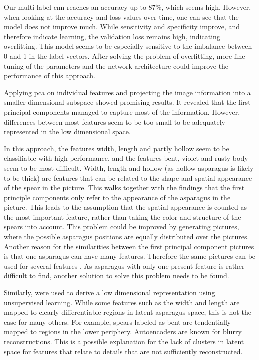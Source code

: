 Our multi-label  \acrshort{cnn} reaches an accuracy up to 87\%, which seems high. However, when looking at the accuracy and loss values over time, one can see that the model does not improve much. While sensitivity and specificity improve, and therefore indicate learning, the validation loss remains high, indicating overfitting. This model seems to be especially sensitive to the imbalance between 0 and 1 in the label vectors. After solving the problem of overfitting, more fine-tuning of the parameters and the network architecture could improve the performance of this approach.

\bigskip
Applying \acrshort{pca} on individual features and projecting the image information into a smaller dimensional subspace showed promising results. It revealed that the first principal components managed to capture most of the information. However, differences between most features seem to be too small to be adequately represented in the low dimensional space.

In this approach, the features width, length and partly hollow seem to be classifiable with high performance, and the features bent, violet and rusty body seem to be most difficult. Width, length and hollow (as hollow asparagus is likely to be thick) are features that can be related to the shape and spatial appearance of the spear in the picture. This walks together with the findings that the first principle components only refer to the appearance of the asparagus in the picture. This leads to the assumption that the spatial appearance is counted as the most important feature, rather than taking the color and structure of the spears into account. This problem could be improved by generating pictures, where the possible asparagus positions are equally distributed over the pictures. Another reason for the similarities between the first principal component pictures is that one asparagus can have many features. Therefore the same pictures can be used for several features . As asparagus with only one present feature is rather difficult to find, another solution to solve this problem needs to be found.

\bigskip
Similarly,  were used to derive a low dimensional representation using unsupervised learning. While some features such as the width and length are mapped to clearly differentiable regions in latent asparagus space, this is not the case for many others. For example, spears labeled as bent are tendentially mapped to regions in the lower periphery. Autoencoders are known for blurry reconstructions. This is a possible explanation for the lack of clusters in latent space for features that relate to details that are not sufficiently reconstructed.

